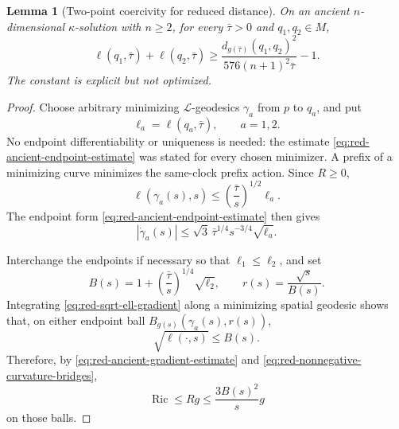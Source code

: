 \documentclass[10pt]{coll-l}
\newtheorem{lemma}[theorem]{Lemma}
\theoremstyle{definition}
\theoremstyle{remark}
\numberwithin{section}{chapter}
\numberwithin{equation}{chapter}
\newcommand{\Ric}{\operatorname{Ric}}
\begin{document}
\begin{lemma}[Two-point coercivity for reduced distance]
\label{lem:red-two-point}
On an ancient $n$-dimensional $\kappa$-solution with $n\geq2$, for every
$\bar\tau>0$ and
$q_1,q_2\in M$,
\begin{equation}
 \ell(q_1,\bar\tau)+\ell(q_2,\bar\tau)
 \geq
 \frac{d_{g(\bar\tau)}(q_1,q_2)^2}
      {576(n+1)^2\bar\tau}-1.                           \label{eq:red-two-point}
\end{equation}
The constant is explicit but not optimized.
\end{lemma}

\begin{proof}
Choose arbitrary minimizing $\mathcal L$-geodesics $\gamma_a$ from $p$ to
$q_a$, and put
\begin{equation}
                 \ell_a=\ell(q_a,\bar\tau),
                 \qquad a=1,2.                          \label{eq:red-two-point-ell-a}
\end{equation}
No endpoint differentiability or uniqueness is needed: the estimate
\eqref{eq:red-ancient-endpoint-estimate} was stated for every chosen
minimizer.  A prefix of a minimizing curve minimizes the same-clock prefix
action.
Since $R\geq0$,
\begin{equation}
 \ell(\gamma_a(s),s)
 \leq\left(\frac{\bar\tau}{s}\right)^{1/2}\ell_a.      \label{eq:red-prefix-ell}
\end{equation}
The endpoint form \eqref{eq:red-ancient-endpoint-estimate} then gives
\begin{equation}
 |\dot\gamma_a(s)|
 \leq\sqrt3\,\bar\tau^{1/4}s^{-3/4}\sqrt{\ell_a}.      \label{eq:red-two-point-endpoint-speed}
\end{equation}

Interchange the endpoints if necessary so that $\ell_1\leq\ell_2$, and set
\begin{equation}
 B(s)=1+\left(\frac{\bar\tau}{s}\right)^{1/4}\sqrt{\ell_2},
 \qquad r(s)=\frac{\sqrt s}{B(s)}.                      \label{eq:red-two-point-radius}
\end{equation}
Integrating \eqref{eq:red-sqrt-ell-gradient} along a minimizing spatial
geodesic shows that, on either endpoint ball
$B_{g(s)}(\gamma_a(s),r(s))$,
\begin{equation}
                         \sqrt{\ell(\cdot,s)}\leq B(s).
                                                               \label{eq:red-two-point-local-ell}
\end{equation}
Therefore, by \eqref{eq:red-ancient-gradient-estimate} and
\eqref{eq:red-nonnegative-curvature-bridges},
\begin{equation}
                  \Ric\leq Rg\leq\frac{3B(s)^2}{s}g    \label{eq:red-two-point-local-Ricci}
\end{equation}
on those balls.


\end{proof}
\end{document}

